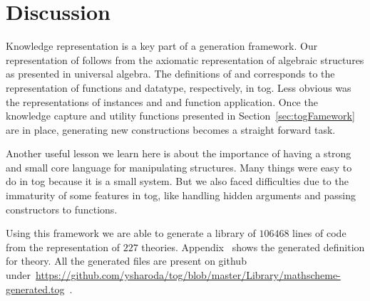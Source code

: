 

\section{Discussion}
\label{sec:generation:discussion}

Knowledge representation is a key part of a generation framework. Our representation of  follows from the axiomatic representation of algebraic structures as presented in universal algebra. The definitions of  and  corresponds to the representation of functions and datatype, respectively, in tog. Less obvious was the representations of instances  and  and function application. 
Once the knowledge capture and utility functions presented in Section~\ref{sec:togFamework} are in place, generating new constructions becomes a straight forward task. 

Another useful lesson we learn here is about the importance of having a strong and small core language for manipulating structures. Many things were easy to do in tog because it is a small system. But we also faced difficulties due to the immaturity of some features in tog, like handling hidden arguments and passing constructors to functions. 

Using this framework we are able to generate a library of $106468$ lines of code from the representation of $227$ theories. Appendix~ shows the generated definition for  theory. All the generated files are present on github under~\url{https://github.com/ysharoda/tog/blob/master/Library/mathscheme-generated.tog}~. 
 
